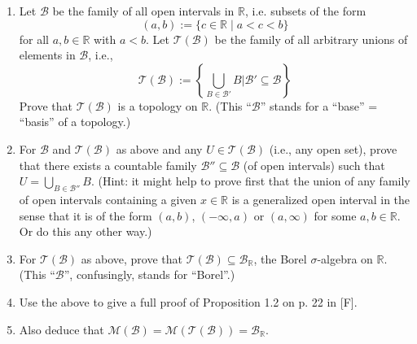 \documentclass[a4paper,11pt,oneside]{book}
\begin{document}
\begin{mystexercise}\label{Open Set as a Topology}\label{open set as a topology}\begin{enumerate}
\item Let $\mathcal{B}$ be the family of all open intervals in $\mathbb{R}$, i.e. subsets of the form
\begin{equation}
(a, b) := \{c \in \mathbb{R} \mid a < c < b\}
\end{equation}
for all $a, b \in \mathbb{R}$ with $a < b$. Let $\mathcal{T}(\mathcal{B})$ be the family of all arbitrary unions of elements in $\mathcal{B}$, i.e.,
\begin{equation}
\mathcal{T}(\mathcal{B}) := \left\{ \bigcup_{B \in \mathcal{B}'} B \mathrel{\Big\vert{}} \mathcal{B}' \subseteq \mathcal{B} \right\}
\end{equation}
Prove that $\mathcal{T}(\mathcal{B})$ is a topology on $\mathbb{R}$. (This ``$\mathcal{B}$'' stands for a ``base'' = ``basis'' of a topology.)


\item For $\mathcal{B}$ and $\mathcal{T}(\mathcal{B})$ as above and any $U \in \mathcal{T}(\mathcal{B})$ (i.e., any open set), prove that there exists a countable family $\mathcal{B}'' \subseteq \mathcal{B}$ (of open intervals) such that $U = \bigcup_{B \in \mathcal{B}''} B$. (Hint: it might help to prove first that the union of any family of open intervals containing a given $x \in \mathbb{R}$ is a generalized open interval in the sense that it is of the form $(a, b)$, $( -\infty, a)$ or $(a, \infty)$ for some $a, b \in \mathbb{R}$. Or do this any other way.)
\item For $\mathcal{T}(\mathcal{B})$ as above, prove that $\mathcal{T}(\mathcal{B}) \subseteq \mathcal{B}_{\mathbb{R}}$, the Borel $\sigma$-algebra on $\mathbb{R}$. (This ``$\mathcal{B}$'', confusingly, stands for ``Borel''.)
\item Use the above to give a full proof of Proposition 1.2 on p. 22 in [F].
\item Also deduce that $\mathcal{M}(\mathcal{B}) = \mathcal{M}(\mathcal{T}(\mathcal{B})) = \mathcal{B}_{\mathbb{R}}$.
\end{enumerate}

\end{mystexercise}
\end{document}
